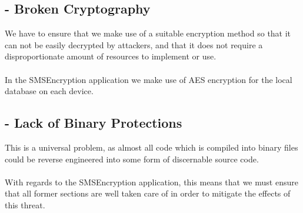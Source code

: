 \subsection*{ - Broken Cryptography}
We have to ensure that we make use of a suitable encryption method so that it can not be easily decrypted by attackers, and that it does not require a disproportionate amount of resources to implement or use.\\
\textbf{\\}
In the SMSEncryption application we make use of AES encryption for the local database on each device.
\subsection*{ - Lack of Binary Protections}
This is a universal problem, as almost all code which is compiled into binary files could be reverse engineered into some form of discernable source code.\\
\textbf{\\}
With regards to the SMSEncryption application, this means that we must ensure that all former sections are well taken care of in order to mitigate the effects of this threat.